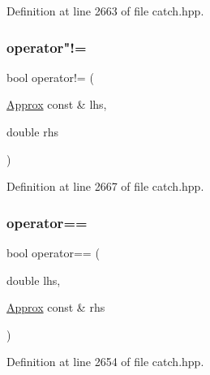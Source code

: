 Definition at line 2663 of file catch.\+hpp.

\hypertarget{class_catch_1_1_detail_1_1_approx_a7497ef839f8026cc0edd6269a80f3e09}{}\label{class_catch_1_1_detail_1_1_approx_a7497ef839f8026cc0edd6269a80f3e09} 
\subsubsection{\texorpdfstring{operator"!=}{operator!=}\hspace{0.1cm}{\footnotesize\ttfamily [2/2]}}
{\footnotesize\ttfamily bool operator!= (\begin{DoxyParamCaption}\item[{\hyperlink{class_catch_1_1_detail_1_1_approx}{Approx} const \&}]{lhs,  }\item[{double}]{rhs }\end{DoxyParamCaption})\hspace{0.3cm}{\ttfamily [friend]}}



Definition at line 2667 of file catch.\+hpp.

\hypertarget{class_catch_1_1_detail_1_1_approx_ac766f044f1c63f0c5997982baefd9049}{}\label{class_catch_1_1_detail_1_1_approx_ac766f044f1c63f0c5997982baefd9049} 
\subsubsection{\texorpdfstring{operator==}{operator==}\hspace{0.1cm}{\footnotesize\ttfamily [1/2]}}
{\footnotesize\ttfamily bool operator== (\begin{DoxyParamCaption}\item[{double}]{lhs,  }\item[{\hyperlink{class_catch_1_1_detail_1_1_approx}{Approx} const \&}]{rhs }\end{DoxyParamCaption})\hspace{0.3cm}{\ttfamily [friend]}}



Definition at line 2654 of file catch.\+hpp.

\hypertarget{class_catch_1_1_detail_1_1_approx_a35999631e6cef569f9da9f3fa910db22}{}\label{class_catch_1_1_detail_1_1_approx_a35999631e6cef569f9da9f3fa910db22} 
